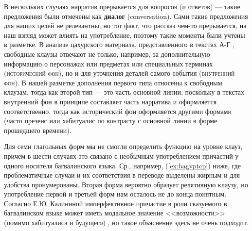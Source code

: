 В нескольких случаях нарратив прерывается для вопросов (и ответов) — такие предложения были отмечены как \textbf{диалог} (conversation). Сами такие предложения для наших целей не релевантны, но тот факт, что рассказ чем-то прерывается, на наш взгляд может влиять на употребление, поэтому такие моменты были учтены в разметке. В анализе цахурского материала, представленного в текстах А-Г \citep[753--769]{tsakhurgram}, свободные клаузы отвечают не только, например, за дополнительную информацию о персонажах или предметах или специальных терминах (\textsc{исторический фон}), но и для уточнения деталей самого события (\textsc{внутренний фон}). В нашей разметке дополнения первого типа относены к свободным клаузам, тогда как второй тип --- это часть основной линии, поскольку в текстах внутренний фон в принципе составляет часть нарратива и оформляется соответственно, тогда как исторический фон оформляется другими формами (часто презенс или хабитуалис по контрасту с основной линии в форме прошедшего времени).
\par Для семи глагольных форм мы не смогли определить функцию на уровне клауз, причем в шести случаях это связано с необычным употреблением причастий у одного носителя багвалинского языка. Ср., например, (\ref{ex:bagvptcp}) ниже, где проблематичные случаи и их соответствия в переводе выделены жирным и для удобства пронумерованы. Вторая форма вероятно образует релятивную клаузу, но употребление первой и третьей форм нам осталось не до конца понятным. Согласно Е.Ю. Калининой имперфективное причастие в роли сказуемого в багвалинском языке может иметь модальное значение <<возможности>> (помимо хабитуалиса и будущего) \citep{Kalinina2003}, но такое объяснение здесь не очень подходит.


